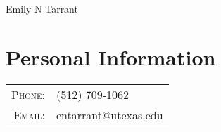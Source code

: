 \documentclass[a4paper,10pt]{article}
\begin{document}
\pagestyle{empty} %

\par{\centering
  {\Huge{Emily N Tarrant}
}\bigskip\par}

\section{Personal Information}
\begin{tabular}{rl}
  \textsc{Phone:}         & (512) 709-1062 \\
  \textsc{Email:}         & entarrant@utexas.edu \\
\end{tabular}

\end{document}

